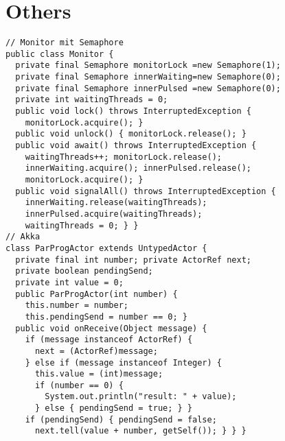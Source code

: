 
\section{Others}
\begin{lstlisting}
// Monitor mit Semaphore
public class Monitor {
  private final Semaphore monitorLock =new Semaphore(1);
  private final Semaphore innerWaiting=new Semaphore(0);
  private final Semaphore innerPulsed =new Semaphore(0);
  private int waitingThreads = 0;
  public void lock() throws InterruptedException {
    monitorLock.acquire(); }
  public void unlock() { monitorLock.release(); }
  public void await() throws InterruptedException {
    waitingThreads++; monitorLock.release();
    innerWaiting.acquire(); innerPulsed.release();
    monitorLock.acquire(); }
  public void signalAll() throws InterruptedException {
    innerWaiting.release(waitingThreads);
    innerPulsed.acquire(waitingThreads);
    waitingThreads = 0; } }
// Akka
class ParProgActor extends UntypedActor {
  private final int number; private ActorRef next;
  private boolean pendingSend;
  private int value = 0;
  public ParProgActor(int number) {
    this.number = number;
    this.pendingSend = number == 0; }
  public void onReceive(Object message) {
    if (message instanceof ActorRef) {
      next = (ActorRef)message;
    } else if (message instanceof Integer) {
      this.value = (int)message;
      if (number == 0) {
        System.out.println("result: " + value);
      } else { pendingSend = true; } }
    if (pendingSend) { pendingSend = false;
      next.tell(value + number, getSelf()); } } }
\end{lstlisting}